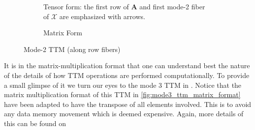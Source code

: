         \begin{figure}[ht!]
            \centering
            
            \begin{subfigure}[b]{0.99\textwidth}
                \centering
                
                \caption[Mode 2 TTM Tensor Format]{Tensor form: the first row of $\mathbf{A}$ and first mode-2 fiber of $\mathcal{X}$ are emphasized with arrows.}
                \label{fig:mode2_ttm_tensor_format}
            \end{subfigure}
            
            \vspace{1em}
            
            \begin{subfigure}[b]{0.99\textwidth}
                \centering
                
                \caption[Mode 2 TTM Tensor Format]{Matrix Form}
                \label{fig:mode2_ttm_matrix_format}
            \end{subfigure}

            \caption[Mode-2 TTM]{Mode-2 TTM (along row fibers)}
            \label{fig:Mode-2_TTM}
        \end{figure}

        It is in the matrix-multiplication format that one can understand best
        the nature of the details of how TTM operations are performed
        computationally. To provide a small glimpse of it we turn our eyes to
        the mode 3 TTM in . Notice that the matrix
        multiplication format of this TTM in \ref{fig:mode3_ttm_matrix_format}
        have been adapted to have the transpose of all elements involved. This
        is to avoid any data memory movement which is deemed expensive. Again,
        more details of this can be found on \cite{Big_Boss}

